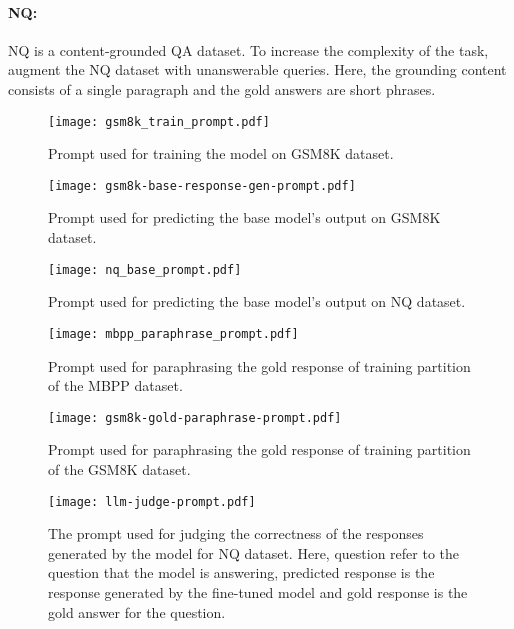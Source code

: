 \paragraph{NQ:} NQ is a content-grounded QA dataset. To increase the complexity of the task, \cite{slobodkin2023curious} augment the NQ dataset with unanswerable queries. Here, the grounding content consists of a single paragraph and the gold answers are short phrases.
\begin{figure}
    \centering
    \texttt{[image: gsm8k\_train\_prompt.pdf]}
    \caption{Prompt used for training the model on GSM8K dataset.}
    \vspace{-0.5em}
    \label{fig:gsm8k_train_prompt}
\end{figure}

\begin{figure}
    \centering
    \texttt{[image: gsm8k-base-response-gen-prompt.pdf]}
    \caption{Prompt used for predicting the base model's output on GSM8K dataset.}
    \vspace{-0.5em}
    \label{fig:gsm8k_base_res_prompt}
\end{figure}

\begin{figure}
    \centering
    \texttt{[image: nq\_base\_prompt.pdf]}
    \caption{Prompt used for predicting the base model's output on NQ dataset.}
    \vspace{-0.5em}
    \label{fig:nq_base_prompt}
\end{figure}

\begin{figure*}
    \centering
    \texttt{[image: mbpp\_paraphrase\_prompt.pdf]}
    \caption{Prompt used for paraphrasing the gold response of training partition of the MBPP dataset.}
    \label{fig:mbpp_gold_para}
\end{figure*} 

\begin{figure*}
    \centering
    \texttt{[image: gsm8k-gold-paraphrase-prompt.pdf]}
    \caption{Prompt used for paraphrasing the gold response of training partition of the GSM8K dataset.}
    \label{fig:gsm8k_gold_para}
\end{figure*}

\begin{figure*}
    \centering
    \texttt{[image: llm-judge-prompt.pdf]}
    \caption{The prompt used for judging the correctness of the responses generated by the model for NQ dataset. Here, {{question}} refer to the question that the model is answering, {{predicted response}} is the response generated by the fine-tuned model and gold response is the gold answer for the question.}
    \label{fig:llm-judge-prompt}
\end{figure*}



